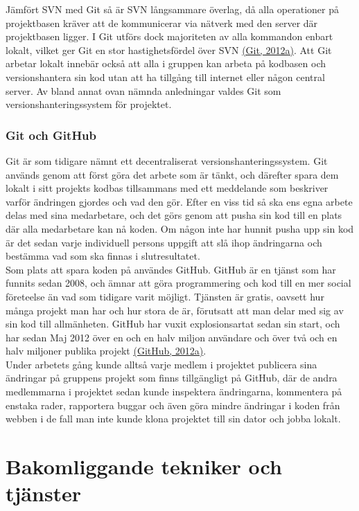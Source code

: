 \documentclass[a4paper,11pt]{article}
\begin{document}
Jämfört SVN med Git så är SVN långsammare överlag, då alla operationer på projektbasen kräver att de kommunicerar via nätverk med den server där projektbasen ligger. I Git utförs dock majoriteten av alla kommandon enbart lokalt, vilket ger Git en stor hastighetsfördel över SVN \hyperref[git]{(Git, 2012a)}. Att Git arbetar lokalt innebär också att alla i gruppen kan arbeta på kodbasen och versionshantera sin kod utan att ha tillgång till internet eller någon central server. Av bland annat ovan nämnda anledningar valdes Git som versionshanteringssystem för projektet.

\subsubsection{Git och GitHub}
Git är som tidigare nämnt ett decentraliserat versionshanteringssystem. Git används genom att först göra det arbete som är tänkt, och därefter spara dem lokalt i sitt projekts kodbas tillsammans med ett meddelande som beskriver varför ändringen gjordes och vad den gör. Efter en viss tid så ska ens egna arbete delas med sina medarbetare, och det görs genom att pusha sin kod till en plats där alla medarbetare kan nå koden. Om någon inte har hunnit pusha upp sin kod är det sedan varje individuell persons uppgift att slå ihop ändringarna och bestämma vad som ska finnas i slutresultatet.\\

Som plats att spara koden på användes GitHub. GitHub är en tjänst som har funnits sedan 2008, och ämnar att göra programmering och kod till en mer social företeelse än vad som tidigare varit möjligt. Tjänsten är gratis, oavsett hur många projekt man har och hur stora de är, förutsatt att man delar med sig av sin kod till allmänheten. GitHub har vuxit explosionsartat sedan sin start, och har sedan Maj 2012 över en och en halv miljon användare och över två och en halv miljoner publika projekt \hyperref[github]{(GitHub, 2012a)}.\\

Under arbetets gång kunde alltså varje medlem i projektet publicera sina ändringar på gruppens projekt som finns tillgängligt på GitHub, där de andra medlemmarna i projektet sedan kunde inspektera ändringarna, kommentera på enstaka rader, rapportera buggar och även göra mindre ändringar i koden från webben i de fall man inte kunde klona projektet till sin dator och jobba lokalt.

\section{Bakomliggande tekniker och tjänster}
\end{document}
